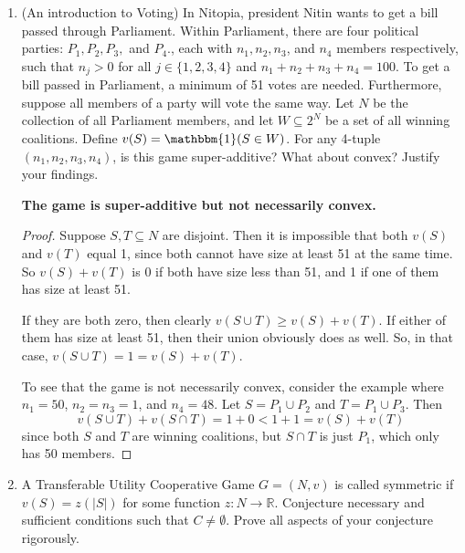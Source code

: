 \documentclass[10pt]{article}
\newcommand{\R}{\mathbb{R}}
\begin{document}
\begin{enumerate}
\noindent \textbf{True}

\begin{proof}
Actually, convexity is not necessary, only super-additivity.  Let $S \subsetneq N$.  Then $$v(N) = v(S \cup S^C) \geq v(S) + v(S^C) \geq v(S),$$ since $v(S^C) \geq 0$.  Thus, $v(N)$ is at least $v(S)$ for all $S \subseteq N$, so $N$ maximizes $v$.
\end{proof}
\pagebreak
\item (An introduction to Voting) In Nitopia, president Nitin wants to get a bill passed through Parliament.  Within Parliament, there are four political parties: $P_1, P_2, P_3,$ and $P_4$., each with $n_1, n_2, n_3$, and $n_4$ members respectively, such that $n_j > 0$ for all $j \in \{1,2,3,4\}$ and $n_1 + n_2 + n_3 + n_4 = 100$.  To get a bill passed in Parliament, a minimum of 51 votes are needed.  Furthermore, suppose all members of a party will vote the same way.  Let $N$ be the collection of all Parliament members, and let $W \subseteq 2^N$ be a set of all winning coalitions.  Define $v(S) = \mathbbm{1}(S \in W)$.  For any 4-tuple $(n_1, n_2, n_3,n_4)$, is this game super-additive?  What about convex?  Justify your findings.

\noindent \textbf{The game is super-additive but not necessarily convex.}

\begin{proof}
Suppose $S, T \subseteq N$ are disjoint.  Then it is impossible that both $v(S)$ and $v(T)$ equal 1, since both cannot have size at least 51 at the same time.  So $v(S) + v(T)$ is 0 if both have size less than 51, and 1 if one of them has size at least 51.

If they are both zero, then clearly $v(S \cup T) \geq v(S) + v(T)$.  If either of them has size at least 51, then their union obviously does as well.  So, in that case, $v(S \cup T) = 1 = v(S) + v(T)$.

To see that the game is not necessarily convex, consider the example where $n_1 = 50$, $n_2 = n_3 = 1$, and $n_4 = 48$.  Let $S = P_1 \cup P_2$ and $T = P_1 \cup P_3$.  Then
$$
v(S \cup T) + v(S \cap T) = 1 + 0 < 1 + 1 = v(S) + v(T)
$$
since both $S$ and $T$ are winning coalitions, but $S \cap T$ is just $P_1$, which only has 50 members.
\end{proof}

\item A Transferable Utility Cooperative Game $G=(N,v)$ is called symmetric if $v(S) = z(|S|)$ for some function $z:N \rightarrow \R$.  Conjecture necessary and sufficient conditions such that $C \neq \emptyset$.  Prove all aspects of your conjecture rigorously.


\end{enumerate}
\end{document}
